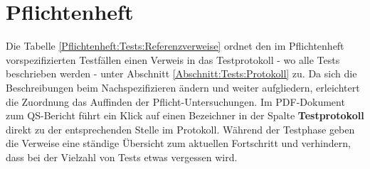 %



\newpage



\section{Pflichtenheft}
\label{Abschnitt:Tests:Protokoll:Pflichtenheft-Verweise}

Die Tabelle \ref{Pflichtenheft:Tests:Referenzverweise} ordnet den im Pflichtenheft vorspezifizierten Testfällen einen Verweis in das Testprotokoll - wo alle Tests beschrieben werden - unter Abschnitt \ref{Abschnitt:Tests:Protokoll} zu. Da sich die Beschreibungen beim Nachspezifizieren ändern und weiter aufgliedern, erleichtert die Zuordnung das Auffinden der Pflicht-Untersuchungen. Im PDF-Dokument zum QS-Bericht führt ein Klick auf einen Bezeichner in der Spalte \textbf{Testprotokoll} direkt zu der entsprechenden Stelle im Protokoll. Während  der Testphase geben die Verweise eine ständige Übersicht zum aktuellen Fortschritt und verhindern, dass bei der Vielzahl von Tests etwas vergessen wird.\\

 

